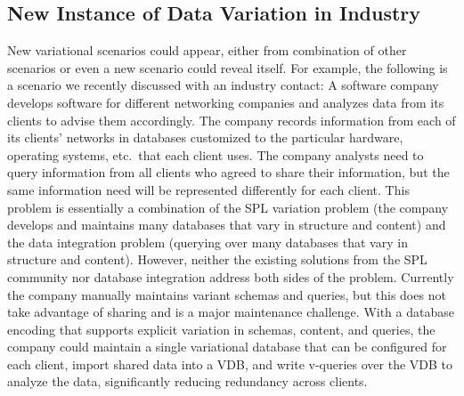 \subsection{New Instance of Data Variation in Industry}
\label{sec:industry-ex}


New variational scenarios could appear, either from combination of other scenarios
or even a new scenario could reveal itself. For example, the following is
a scenario we recently discussed with an industry contact:
%
A software company develops software for different networking companies and
analyzes data from its clients to advise them accordingly. 
%
The company records information from each of its clients' networks in databases
customized to the particular hardware, operating systems, etc.\ that each
client uses.
%
The company analysts need to query information from all clients who agreed to
share their information, but the same information need will be represented
differently for each client.
%
This problem is essentially a combination of the SPL variation problem (the
company develops and maintains many databases that vary in structure and
content) and the data integration problem (querying over many databases that
vary in structure and content). However, neither the existing solutions from
the SPL community nor database integration address both sides of the problem.
%
Currently the company manually maintains variant schemas and queries, but this
does not take advantage of sharing and is a major maintenance challenge.
%
With a database encoding that supports explicit variation in schemas, content,
and queries, the company could maintain a single variational database that can
be configured for each client, import shared data into a VDB, and write
v-queries over the VDB to analyze the data, significantly reducing redundancy
across clients.